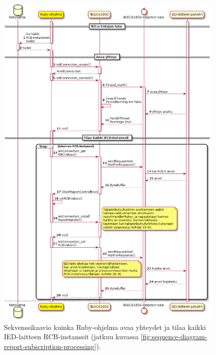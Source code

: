 \begin{figure}
	\includegraphics[width=1\textwidth]{pictures/sequence-diagram-report-subscription.png}
	\caption{Sekvenssikaavio kuinka Ruby-ohjelma avaa yhteydet ja tilaa kaikki IED-laitteen RCB-instanssit (jatkuu kuvassa \ref{fig:sequence-diagram-report-subscription-processing}).}
	\label{fig:sequence-diagram-report-subscription}
\end{figure}

